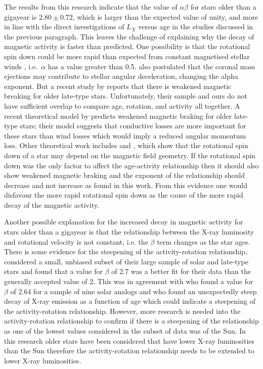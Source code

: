 The results from this research indicate that the value of $\alpha\beta$ for stars older than a gigayear is $2.80 \pm 0.72$, which is larger than the expected value of unity, and more in line with the direct investigations of $L_X$ versus age in the studies discussed in the previous paragraph. This leaves the challenge of explaining why the decay of magnetic activity is faster than predicted. One possibility is that the rotational spin down could be more rapid than expected from constant magnetised stellar winds \citep{Kawaler_1988}, i.e.\ $\alpha$ has a value greater than 0.5. \citet{Feigelson_etal_2004} also postulated that the coronal mass ejections may contribute to stellar angular deceleration, changing the alpha exponent. But a recent study by \citet{van_Saders_etal_2016} reports that there is weakened magnetic breaking for older late-type stars. Unfortunately, their sample and ours do not have sufficient overlap to compare age, rotation, and activity all together. A recent theoretical model by \citet{Blackman_Owen_2016} predicts weakened magnetic braking for older late-type stars; their model suggests that conductive losses are more important for these stars than wind losses which would imply a reduced angular momentum loss. Other theoretical work includes \citet{Garraffo_etal_2015} and \citet{Vidotto_etal_2016}, which show that the rotational spin down of a star may depend on the magnetic field geometry. If the rotational spin down was the only factor to affect the age-activity relationship then it should also show weakened magnetic braking and the exponent of the relationship should decrease and not increase as found in this work. From this evidence one would disfavour the more rapid rotational spin down as the cause of the more rapid decay of the magnetic activity.

Another possible explanation for the increased decay in magnetic activity for stars older than a gigayear is that the relationship between the X-ray luminosity and rotational velocity is not constant, i.e. the $\beta$ term changes as the star ages. There is some evidence for the steepening of the activity-rotation relationship, \citet{Wright_etal_2011} considered a small, unbiased subset of their large sample of solar and late-type stars and found that a value for $\beta$ of 2.7 was a better fit for their data than the generally accepted value of 2. This was in agreement with \citet{Gudel_etal_1997} who found a value for $\beta$ of 2.64 for a sample of nine solar analogs and \citet{Feigelson_etal_2004} who found an unexpectedly steep decay of X-ray emission as a function of age which could indicate a steepening of the activity-rotation relationship. However, more research is needed into the activity-rotation relationship to confirm if there is a steepening of the relationship as one of the lowest values considered in the \citet{Wright_etal_2011} subset of data was of the Sun. In this research older stars have been considered that have lower X-ray luminosities than the Sun therefore the activity-rotation relationship needs to be extended to lower X-ray luminosities.

